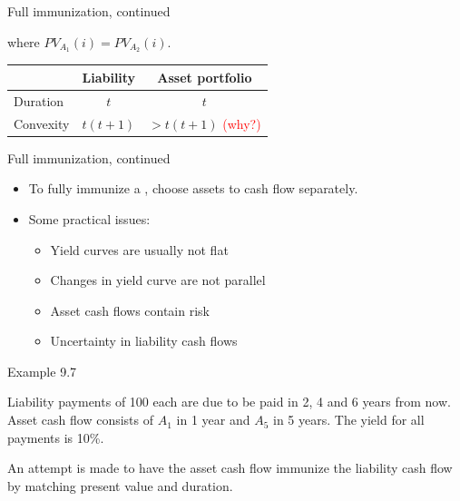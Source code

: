 \documentclass{beamer}
\begin{document}
\begin{frame}{Full immunization, continued}

\begin{center}
\end{center}

where $PV_{A_1}(i) = PV_{A_2}(i)$.

\begin{center}
\renewcommand{\arraystretch}{1.3}
\begin{tabular}{lcc}
\toprule
 & \textbf{Liability} & \textbf{Asset portfolio} \\
\midrule
Duration & $t$ & $t$ \\
Convexity & $t(t+1)$ & $> t(t+1)$ \textcolor{red}{(why?)} \\
\bottomrule
\end{tabular}
\end{center}

\end{frame}

\begin{frame}{Full immunization, continued}

\begin{itemize}
\item To fully immunize a , choose assets to  cash flow separately.
\medskip
\item Some practical issues:
\begin{itemize}
\item Yield curves are usually not flat
\item Changes in yield curve are not parallel
\item Asset cash flows contain risk
\item Uncertainty in liability cash flows
\end{itemize}
\end{itemize}

\end{frame}

\begin{frame}{Example 9.7}

Liability payments of 100 each are due to be paid in 2, 4 and 6 years from now. Asset cash flow consists of $A_1$ in 1 year and $A_5$ in 5 years. The yield for all payments is 10\%.

\medskip
An attempt is made to have the asset cash flow immunize the liability cash flow by matching present value and duration.

\end{frame}
\end{document}
